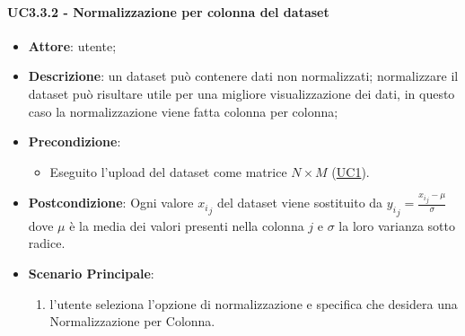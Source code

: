     \paragraph{UC3.3.2 - Normalizzazione per colonna del dataset}
    \label{uc3.3.2}
    \begin{itemize}
    \item \textbf{Attore}: utente;
    \item \textbf{Descrizione}: un dataset può contenere dati non normalizzati; normalizzare il dataset può risultare utile per una migliore visualizzazione dei dati, in questo caso la normalizzazione viene fatta colonna per colonna;
    \item \textbf{Precondizione}: 
    \begin{itemize}
        \item Eseguito l'upload del dataset come matrice $N\times M$ (\hyperref[uc1]{UC1}).
    \end{itemize}  
    \item \textbf{Postcondizione}: Ogni valore ${x_i}_j$ del dataset viene sostituito da $ {y_i}_j = \frac{{x_i}_j - \mu}{\sigma}$ dove $\mu$ è la media dei valori presenti nella colonna $j$ e $\sigma$ la loro varianza sotto radice.
    \item \textbf{Scenario Principale}: 
    \begin{enumerate}
        \item l'utente seleziona l'opzione di normalizzazione e specifica che desidera una Normalizzazione per Colonna. 
    \end{enumerate}  
    \end{itemize}
    
